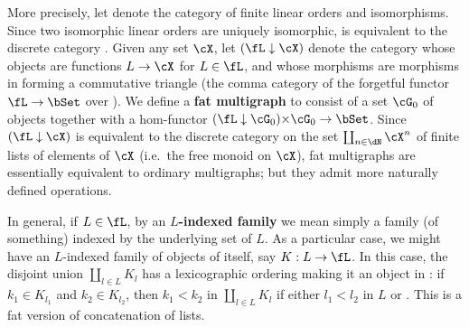 \documentclass{book}
\begin{document}
More precisely, let \fL denote the category of finite linear orders and isomorphisms.
Since two isomorphic linear orders are uniquely isomorphic, \fL is equivalent to the discrete category \dN.
Given any set $\cX$, let $(\fL\dn \cX)$ denote the category whose objects are functions $L\to \cX$ for $L\in \fL$, and whose morphisms are morphisms in \fL forming a commutative triangle (the comma category of the forgetful functor $\fL\to \bSet$ over \cX).
We define a \textbf{fat multigraph} to consist of a set $\cG_0$ of objects together with a hom-functor $(\fL\dn\cG_0)\times \cG_0 \to \bSet$.
Since $(\fL\dn \cX)$ is equivalent to the discrete category on the set $\coprod_{n\in\dN} \cX^n$ of finite lists of elements of $\cX$ (i.e.\ the free monoid on $\cX$), fat multigraphs are essentially equivalent to ordinary multigraphs; but they admit more naturally defined operations.

In general, if $L\in\fL$, by an \textbf{$L$-indexed family} we mean simply a family (of something) indexed by the underlying set of $L$.
As a particular case, we might have an $L$-indexed family of objects of \fL itself, say $K:L\to \fL$.
In this case, the disjoint union $\coprod_{l\in L} K_l$ has a lexicographic ordering making it an object in \fL: if $k_1\in K_{l_1}$ and $k_2\in K_{l_2}$, then $k_1<k_2$ in $\coprod_{l\in L} K_l$ if either $l_1<l_2$ in $L$ or \big[$l_1=l_2$ in $L$ and $k_1<k_2$ in $K_{l_1}(=K_{l_2})$\big].
This is a fat version of concatenation of lists.
\end{document}
